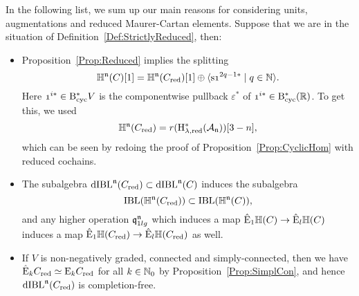 \documentclass[\MainFolder/Text.tex]{subfiles}
\begin{document}
In the following list, we sum up our main reasons for considering units, augmentations and reduced Maurer-Cartan elements. Suppose that we are in the situation of Definition~\ref{Def:StrictlyReduced}, then:
\begin{itemize}
 \item  Proposition~\ref{Prop:Reduced} implies the splitting
\begin{equation}\label{Eq:IBLSPlit}
 \HIBL^\PMC(\CycC)[1] = \HIBL^\PMC(\CycC_{\mathrm{red}})[1] \oplus \langle \Susp \NOne^{2q-1 *} \mid q\in \N \rangle.
\end{equation}
Here $\NOne^{i*} \in \DBCyc V$ is the componentwise pullback $\varepsilon^*$ of $\NOne^{i*}\in \DBCyc(\R)$. To get this, we used
\begin{equation*} 
\mathbb{H}^{\mathfrak{n}}(C_{\mathrm{red}}) =  r(\mathrm{H}_{\lambda,\mathrm{red}}^*(\mathcal{A}_{\mathfrak{n}}))[3-n],
\end{equation*}
which can be seen by redoing the proof of Proposition~\ref{Prop:CyclicHom} with reduced cochains.
\item The subalgebra $\mathrm{dIBL}^{\mathfrak{n}}(C_{\mathrm{red}})\subset \mathrm{dIBL}^{\mathfrak{n}}(C)$ induces the subalgebra 
$$\mathrm{IBL}(\mathbb{H}^{\mathfrak{n}}(C_{\mathrm{red}}))\subset \mathrm{IBL}(\mathbb{H}^{\mathfrak{n}}(C)), $$
and any higher operation $\mathfrak{q}_{1lg}^{\mathfrak{n}}$ which induces a map $\hat{\mathrm{E}}_1 \mathbb{H}(C) \rightarrow \hat{\mathrm{E}}_l \mathbb{H}(C)$ induces a map $\hat{\mathrm{E}}_1\mathbb{H}(C_{\mathrm{red}}) \rightarrow \hat{\mathrm{E}}_l\mathbb{H}(C_{\mathrm{red}})$ as well.
\item If $V$ is non-negatively graded, connected and simply-connected, then we have $\hat{\mathrm{E}}_k C_{\mathrm{red}} \simeq \mathrm{E}_k C_{\mathrm{red}}$ for all $k\in \mathbb{N}_0$ by Proposition~\ref{Prop:SimplCon}, and hence $\mathrm{dIBL}^{\mathfrak{n}}(C_{\mathrm{red}})$ is completion-free. 
\end{itemize}
\end{document}
